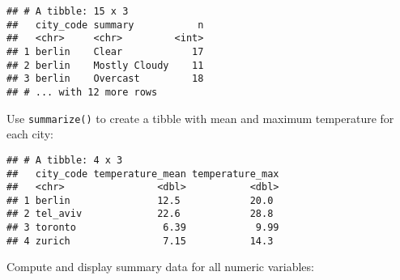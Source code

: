 \documentclass[]{book}
\newenvironment{Shaded}{\begin{snugshade}}{\end{snugshade}}
\newcommand{\DataTypeTok}[1]{\textcolor[rgb]{0.13,0.29,0.53}{#1}}
\newcommand{\KeywordTok}[1]{\textcolor[rgb]{0.13,0.29,0.53}{\textbf{#1}}}
\newcommand{\NormalTok}[1]{#1}
\newcommand{\OperatorTok}[1]{\textcolor[rgb]{0.81,0.36,0.00}{\textbf{#1}}}
\newcommand{\StringTok}[1]{\textcolor[rgb]{0.31,0.60,0.02}{#1}}
\begin{document}
\begin{verbatim}
## # A tibble: 15 x 3
##   city_code summary           n
##   <chr>     <chr>         <int>
## 1 berlin    Clear            17
## 2 berlin    Mostly Cloudy    11
## 3 berlin    Overcast         18
## # ... with 12 more rows
\end{verbatim}

Use \texttt{summarize()} to create a tibble with mean and maximum temperature for each city:

\begin{Shaded}
\end{Shaded}

\begin{verbatim}
## # A tibble: 4 x 3
##   city_code temperature_mean temperature_max
##   <chr>                <dbl>           <dbl>
## 1 berlin               12.5            20.0 
## 2 tel_aviv             22.6            28.8 
## 3 toronto               6.39            9.99
## 4 zurich                7.15           14.3
\end{verbatim}

Compute and display summary data for all numeric variables:

\begin{Shaded}
\end{Shaded}
\end{document}
